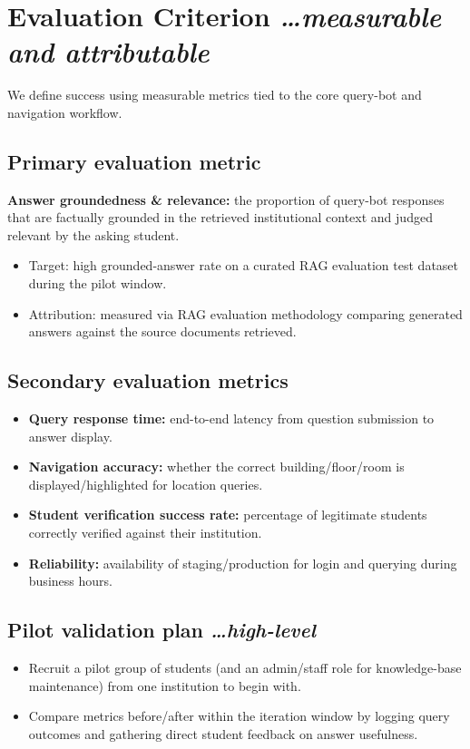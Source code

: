 \documentclass[11pt,a4paper]{article}
\newcommand{\BvrHint}[1]{%
  {\normalfont\normalsize\itshape\hfill #1}}
\begin{document}
\section{Evaluation Criterion %
\BvrHint{\ldots measurable and attributable}}
We define success using measurable metrics tied to the core query-bot
and navigation workflow.

\subsection{Primary evaluation metric}
\textbf{Answer groundedness \& relevance:} the proportion of query-bot
responses that are factually grounded in the retrieved institutional
context and judged relevant by the asking student.
\begin{itemize}[leftmargin=0.7cm]
    \item Target: high grounded-answer rate on a curated RAG evaluation test dataset during the pilot window.
    \item Attribution: measured via RAG evaluation methodology comparing generated answers against the source documents retrieved.
\end{itemize}

\subsection{Secondary evaluation metrics}
\begin{itemize}[leftmargin=0.7cm]
    \item \textbf{Query response time:} end-to-end latency from question submission to answer display.
    \item \textbf{Navigation accuracy:} whether the correct building/floor/room is displayed/highlighted for location queries.
    \item \textbf{Student verification success rate:} percentage of legitimate students correctly verified against their institution.
    \item \textbf{Reliability:} availability of staging/production for login and querying during business hours.
\end{itemize}

\subsection{Pilot validation plan %
\BvrHint{\ldots high-level}}
\begin{itemize}[leftmargin=0.7cm]
    \item Recruit a pilot group of students (and an admin/staff role for knowledge-base maintenance) from one institution to begin with.
    \item Compare metrics before/after within the iteration window by logging query outcomes and gathering direct student feedback on answer usefulness.
\end{itemize}
\end{document}
